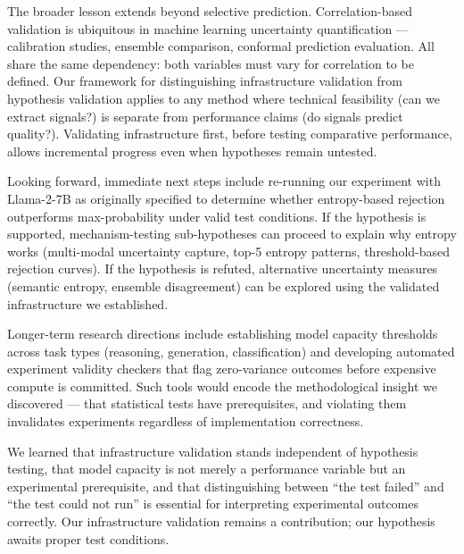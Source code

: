 The broader lesson extends beyond selective prediction. Correlation-based validation is ubiquitous in machine learning uncertainty quantification --- calibration studies, ensemble comparison, conformal prediction evaluation. All share the same dependency: both variables must vary for correlation to be defined. Our framework for distinguishing infrastructure validation from hypothesis validation applies to any method where technical feasibility (can we extract signals?) is separate from performance claims (do signals predict quality?). Validating infrastructure first, before testing comparative performance, allows incremental progress even when hypotheses remain untested.

Looking forward, immediate next steps include re-running our experiment with Llama-2-7B as originally specified to determine whether entropy-based rejection outperforms max-probability under valid test conditions. If the hypothesis is supported, mechanism-testing sub-hypotheses can proceed to explain why entropy works (multi-modal uncertainty capture, top-5 entropy patterns, threshold-based rejection curves). If the hypothesis is refuted, alternative uncertainty measures (semantic entropy, ensemble disagreement) can be explored using the validated infrastructure we established.

Longer-term research directions include establishing model capacity thresholds across task types (reasoning, generation, classification) and developing automated experiment validity checkers that flag zero-variance outcomes before expensive compute is committed. Such tools would encode the methodological insight we discovered --- that statistical tests have prerequisites, and violating them invalidates experiments regardless of implementation correctness.

We learned that infrastructure validation stands independent of hypothesis testing, that model capacity is not merely a performance variable but an experimental prerequisite, and that distinguishing between ``the test failed'' and ``the test could not run'' is essential for interpreting experimental outcomes correctly. Our infrastructure validation remains a contribution; our hypothesis awaits proper test conditions.
